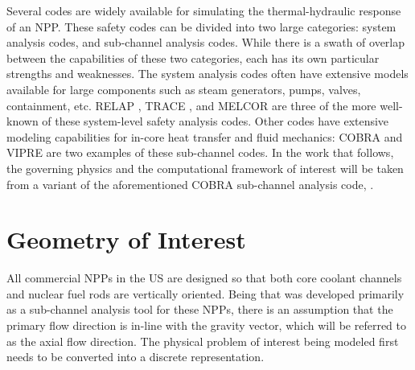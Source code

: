 Several codes are widely available for simulating the thermal-hydraulic response of an NPP.
These safety codes can be divided into two large categories: system analysis codes, and sub-channel analysis codes.
While there is a swath of overlap between the capabilities of these two categories, each has its own particular strengths and weaknesses.
The system analysis codes often have extensive models available for large components such as steam generators, pumps, valves, containment, etc.
RELAP \cite{RELAP}, TRACE \cite{TRACE}, and MELCOR \cite{Summers1994} are three of the more well-known of these system-level safety analysis codes.
Other codes have extensive modeling capabilities for in-core heat transfer and fluid mechanics: COBRA \cite{Thurgood1983c} and VIPRE are two examples of these sub-channel codes.
In the work that follows, the governing physics and the computational framework of interest will be taken from a variant of the aforementioned COBRA sub-channel analysis code, \cobra{}.
\section{Geometry of Interest}
\label{sect:topology}
All commercial NPPs in the US are designed so that both core coolant channels and nuclear fuel rods are vertically oriented.
Being that \cobra{} was developed primarily as a sub-channel analysis tool for these NPPs, there is an assumption that the primary flow direction is in-line with the gravity vector, which will be referred to as the axial flow direction.
The physical problem of interest being modeled first needs to be converted into a discrete representation.

